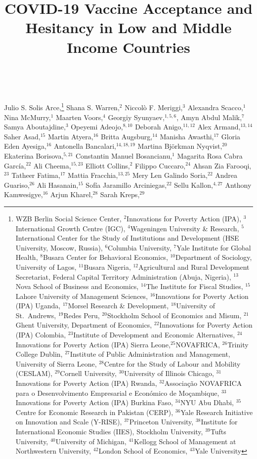 \documentclass[
  12pt,
]{article}
\title{COVID-19 Vaccine Acceptance and Hesitancy in Low and Middle Income Countries}
\author{}
\date{\vspace{-2.5em}}
\begin{document}
\maketitle

﻿

Julio S. Solis Arce,\footnote{WZB Berlin Social Science Center, \(^2\)Innovations for Poverty Action (IPA), \(^3\)International Growth Centre (IGC), \(^4\)Wageningen University \& Research, \(^5\)International Center for the Study of Institutions and Development (HSE University, Moscow, Russia), \(^6\)Columbia University, \(^7\)Yale Institute for Global Health, \(^8\)Busara Center for Behavioral Economics, \(^{10}\)Department of Sociology, University of Lagos, \(^{11}\)Busara Nigeria, \(^{12}\)Agricultural and Rural Development Secretariat, Federal Capital Territory Administration (Abuja, Nigeria), \(^{13}\)Nova School of Business and Economics, \(^{14}\)The Institute for Fiscal Studies, \(^{15}\)Lahore University of Management Sciences, \(^{16}\)Innovations for Poverty Action (IPA) Uganda, \(^{17}\)Morsel Research \& Development, \(^{18}\)University of St.~Andrews, \(^{19}\)Redes Peru, \(^{20}\)Stockholm School of Economics and Misum, \(^{21}\)Ghent University, Department of Economics, \(^{22}\)Innovations for Poverty Action (IPA) Colombia, \(^{23}\)Institute of Development and Economic Alternatives, \(^{24}\)Innovations for Poverty Action (IPA) Sierra Leone,\(^{25}\)NOVAFRICA, \(^{26}\)Trinity College Dublin, \(^{27}\)Institute of Public Administration and Management, University of Sierra Leone, \(^{28}\)Centre for the Study of Labour and Mobility (CESLAM), \(^{29}\)Cornell University, \(^{30}\)University of Illinois Chicago, \(^{31}\)Innovations for Poverty Action (IPA) Rwanda, \(^{32}\)Associação NOVAFRICA para o Desenvolvimento Empresarial e Económico de Moçambique, \(^{33}\)Innovations for Poverty Action (IPA) Burkina Faso, \(^{34}\)NYU Abu Dhabi, \(^{35}\)Centre for Economic Research in Pakistan (CERP), \(^{36}\)Yale Research Initiative on Innovation and Scale (Y-RISE), \(^{37}\)Princeton University, \(^{38}\)Institute for International Economic Studies (IIES), Stockholm University, \(^{39}\)Tufts University, \(^{40}\)University of Michigan, \(^{41}\)Kellogg School of Management at Northwestern University, \(^{42}\)London School of Economics, \(^{43}\)Yale University} Shana S. Warren,\(^2\) Niccolò F. Meriggi,\(^3\) Alexandra Scacco,\(^1\) Nina McMurry,\(^1\) Maarten Voors,\(^4\) Georgiy Syunyaev,\(^{1,5,6}\), Amyn Abdul Malik,\(^7\) Samya Aboutajdine,\(^3\) Opeyemi Adeojo,\(^{8, 10}\) Deborah Anigo,\(^{11, 12}\) Alex Armand,\(^{13, 14}\) Saher Asad,\(^{15}\) Martin Atyera,\(^{16}\) Britta Augsburg,\(^{14}\) Manisha Awasthi,\(^{17}\) Gloria Eden Ayesiga,\(^{16}\) Antonella Bancalari,\(^{14, 18, 19}\) Martina Björkman Nyqvist,\(^{20}\) Ekaterina Borisova,\(^{5, 21}\) Constantin Manuel Bosancianu,\(^1\) Magarita Rosa Cabra García,\(^22\) Ali Cheema,\(^{15, 23}\) Elliott Collins,\(^{2}\) Filippo Cuccaro,\(^{24}\) Ahsan Zia Farooqi,\(^{23}\) Tatheer Fatima,\(^{17}\) Mattia Fracchia,\(^{13, 25}\) Mery Len Galindo Soria,\(^{22}\) Andrea Guariso,\(^{26}\) Ali Hasanain,\(^{15}\) Sofía Jaramillo Arciniegas,\(^{22}\) Sellu Kallon,\(^{4, 27}\) Anthony Kamwesigye,\(^{16}\) Arjun Kharel,\(^{28}\) Sarah Kreps,\(^{29}\) 
\end{document}
